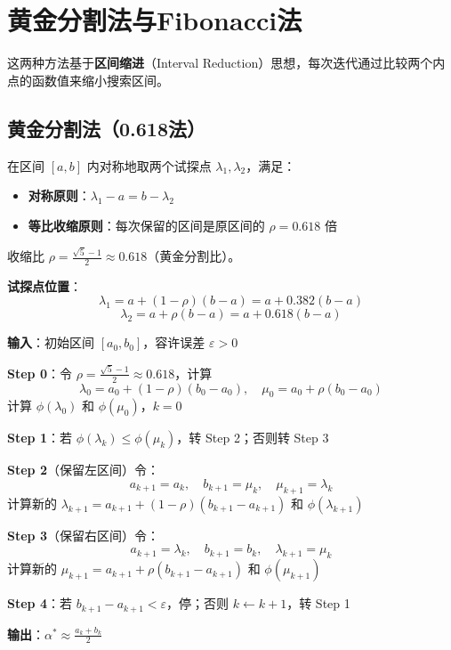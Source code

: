 \section{黄金分割法与Fibonacci法}\label{sec:golden-fibonacci}

这两种方法基于\textbf{区间缩进}（Interval Reduction）思想，每次迭代通过比较两个内点的函数值来缩小搜索区间。

\subsection{黄金分割法（0.618法）}

\begin{conceptbox}[黄金分割法原理]
在区间 $[a, b]$ 内对称地取两个试探点 $\lambda_1, \lambda_2$，满足：
\begin{itemize}
    \item \textbf{对称原则}：$\lambda_1 - a = b - \lambda_2$
    \item \textbf{等比收缩原则}：每次保留的区间是原区间的 $\rho = 0.618$ 倍
\end{itemize}
收缩比 $\rho = \frac{\sqrt{5}-1}{2} \approx 0.618$（黄金分割比）。
\end{conceptbox}

\textbf{试探点位置}：
\[
\lambda_1 = a + (1-\rho)(b-a) = a + 0.382(b-a)
\]
\[
\lambda_2 = a + \rho(b-a) = a + 0.618(b-a)
\]

\begin{algobox}[黄金分割法算法]
\textbf{输入}：初始区间 $[a_0, b_0]$，容许误差 $\varepsilon > 0$

\textbf{Step 0}：令 $\rho = \frac{\sqrt{5}-1}{2} \approx 0.618$，计算
\[
\lambda_0 = a_0 + (1-\rho)(b_0 - a_0),\quad \mu_0 = a_0 + \rho(b_0 - a_0)
\]
计算 $\phi(\lambda_0)$ 和 $\phi(\mu_0)$，$k = 0$

\textbf{Step 1}：若 $\phi(\lambda_k) \leq \phi(\mu_k)$，转 Step 2；否则转 Step 3

\textbf{Step 2}（保留左区间）令：
\[
a_{k+1} = a_k,\quad b_{k+1} = \mu_k,\quad \mu_{k+1} = \lambda_k
\]
计算新的 $\lambda_{k+1} = a_{k+1} + (1-\rho)(b_{k+1} - a_{k+1})$ 和 $\phi(\lambda_{k+1})$

\textbf{Step 3}（保留右区间）令：
\[
a_{k+1} = \lambda_k,\quad b_{k+1} = b_k,\quad \lambda_{k+1} = \mu_k
\]
计算新的 $\mu_{k+1} = a_{k+1} + \rho(b_{k+1} - a_{k+1})$ 和 $\phi(\mu_{k+1})$

\textbf{Step 4}：若 $b_{k+1} - a_{k+1} < \varepsilon$，停；否则 $k \leftarrow k+1$，转 Step 1

\textbf{输出}：$\alpha^* \approx \frac{a_k + b_k}{2}$
\end{algobox}

